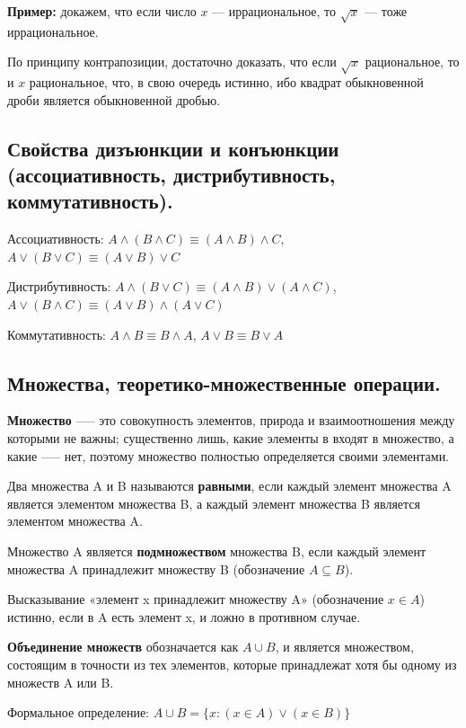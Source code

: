 \documentclass[a4paper, 10pt]{article}
\begin{document}
\textbf{Пример:} докажем, что если число $x$ --- иррациональное, то $\sqrt{x}$ --- тоже иррациональное.

По принципу контрапозиции, достаточно доказать, что если $\sqrt{x}$ рациональное, то и $x$ рациональное, что, в свою очередь истинно, ибо квадрат обыкновенной дроби является обыкновенной дробью.


\subsection{Свойства дизъюнкции и конъюнкции (ассоциативность, дистрибутивность, коммутативность).}

Ассоциативность: $A \wedge (B \wedge C) \equiv (A \wedge B) \wedge C$, \qquad $A \vee (B \vee C) \equiv (A \vee B) \vee C$

Дистрибутивность: $A \wedge (B \vee C) \equiv (A \wedge B) \vee (A \wedge C)$, \qquad $A \vee (B \wedge C) \equiv (A \vee B) \wedge (A \vee C)$

Коммутативность: $A \wedge B \equiv B \wedge A$, \qquad $A \vee B \equiv B \vee A$


\subsection{Множества, теоретико-множественные операции.}

\textbf{Множество} —-- это совокупность элементов, природа и взаимоотношения между которыми не важны; существенно лишь, какие элементы в входят в множество, а какие —-- нет, поэтому множество полностью определяется своими элементами. 

Два множества A и B называются \textbf{равными}, если каждый элемент множества A является элементом множества B, а каждый элемент множества B является элементом множества A.

Множество A является \textbf{подмножеством} множества B, если каждый элемент множества A принадлежит множеству B (обозначение $A \subseteq B$). 

Высказывание «элемент x принадлежит множеству A» (обозначение $x \in A$) истинно, если в A есть элемент x, и ложно в противном случае.

\textbf{Объединение множеств} обозначается как $A \cup B$, и является множеством, состоящим в точности из тех элементов, которые принадлежат хотя бы одному из множеств A или B. 

Формальное определение: $A \cup B = \{x \colon (x \in A) \vee (x \in B)\}$
\end{document}
